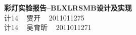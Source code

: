 \documentclass[a4paper]{article}
\begin{document}
\begin{center}
	{\Large \bf 彩灯实验报告--BLXLRSMB设计及实现} \\
	\vspace{1.5em}
	计14 ~ 贾\hspace{1em}开 ~ 2011011275 \\
	计14 ~ 吴育昕 ~ 2011011271
\end{center}

\tableofcontents




\end{document}
